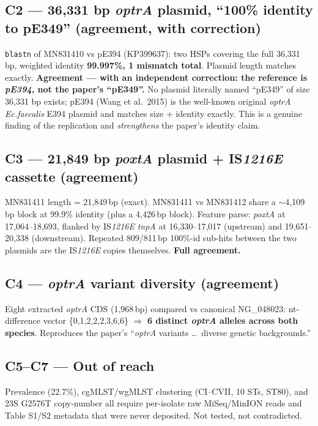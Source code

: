 \documentclass[11pt,letterpaper]{article}
\begin{document}
\subsection{C2 --- 36{,}331 bp \emph{optrA} plasmid, ``100\% identity to pE349'' (agreement, with correction)}
\texttt{blastn} of MN831410 vs pE394 (KP399637): two HSPs covering the full 36{,}331 bp, weighted identity \textbf{99.997\%, 1 mismatch total}. Plasmid length matches exactly. \textbf{Agreement --- with an independent correction: the reference is \emph{pE394}, not the paper's ``pE349''.} No plasmid literally named ``pE349'' of size 36{,}331 bp exists; pE394 (Wang et al.\ 2015) is the well-known original \emph{optrA} \emph{Ec.faecalis} E394 plasmid and matches size + identity exactly. This is a genuine finding of the replication and \emph{strengthens} the paper's identity claim.

\subsection{C3 --- 21{,}849 bp \emph{poxtA} plasmid + IS\emph{1216E} cassette (agreement)}
MN831411 length = 21{,}849\,bp (exact). MN831411 vs MN831412 share a $\sim$4{,}109\,bp block at 99.9\% identity (plus a 4{,}426\,bp block). Feature parse: \emph{poxtA} at 17{,}064--18{,}693, flanked by IS\emph{1216E} \emph{tnpA} at 16{,}330--17{,}017 (upstream) and 19{,}651--20{,}338 (downstream). Repeated 809/811\,bp 100\%-id sub-hits between the two plasmids are the IS\emph{1216E} copies themselves. \textbf{Full agreement.}

\subsection{C4 --- \emph{optrA} variant diversity (agreement)}
Eight extracted \emph{optrA} CDS (1{,}968\,bp) compared vs canonical NG\_048023: nt-difference vector \{0,1,2,2,2,3,6,6\} $\Rightarrow$ \textbf{6 distinct \emph{optrA} alleles across both species}. Reproduces the paper's ``\emph{optrA} variants \ldots\ diverse genetic backgrounds.''

\subsection{C5--C7 --- Out of reach}
Prevalence (22.7\%), cgMLST/wgMLST clustering (CI--CVII, 10 STs, ST80), and 23S G2576T copy-number all require per-isolate raw MiSeq/MinION reads and Table S1/S2 metadata that were never deposited. Not tested, not contradicted.
\end{document}

